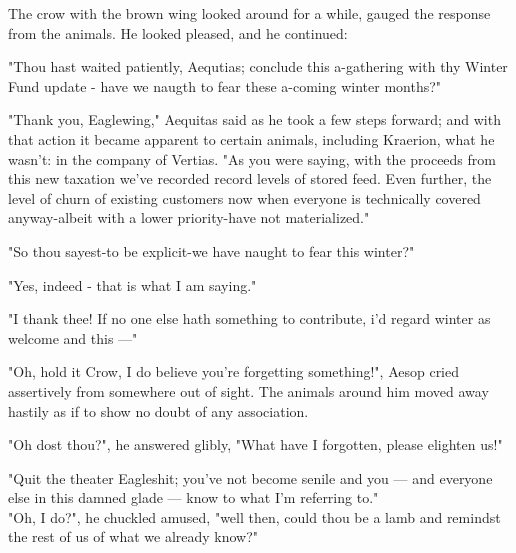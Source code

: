 The crow with the brown wing looked around for a while, gauged the response from the animals. He looked pleased, and he continued:

"Thou hast waited patiently, Aequtias; conclude this a-gathering with thy Winter Fund update - have we naugth to fear these a-coming winter months?"

"Thank you, Eaglewing," Aequitas said as he took a few steps forward; and with that action it became apparent to certain animals, including Kraerion, what he wasn't: in the company of Vertias. "As you were saying, with the proceeds from this new taxation we've recorded record levels of stored feed. Even further, the level of churn of existing customers now when everyone is technically covered anyway-albeit with a lower priority-have not materialized."

"So thou sayest-to be explicit-we have naught to fear this winter?"

"Yes, indeed - that is what I am saying."

"I thank thee! If no one else hath something to contribute, i'd regard winter as welcome and this —"

"Oh, hold it Crow, I do believe you're forgetting something!", Aesop cried assertively from somewhere out of sight. The animals around him moved away hastily as if to show no doubt of any association.

"Oh dost thou?", he answered glibly, "What have I forgotten, please elighten us!"


"Quit the theater Eagleshit; you've not become senile and you — and everyone else in this damned glade — know to what I'm referring to."\\


"Oh, I do?", he chuckled amused, "well then, could thou be a lamb and remindst the rest of us of what we already know?"

